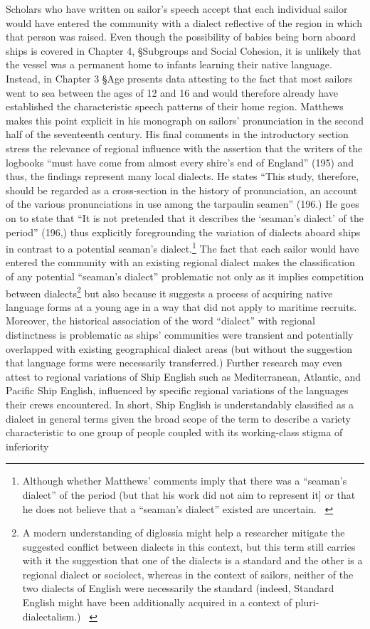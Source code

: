 \documentclass[12pt]{article}
\newcommand\textstylereferencetext[1]{#1}
\newenvironment{styleStandard}{\renewcommand\baselinestretch{1.0}\setlength\leftskip{0cm}\setlength\rightskip{0cm plus 1fil}\setlength\parindent{0cm}\setlength\parfillskip{0pt plus 1fil}\setlength\parskip{0in plus 1pt}\writerlistparindent\writerlistleftskip\leavevmode\normalfont\normalsize\writerlistlabel\ignorespaces}{\unskip\vspace{0in plus 1pt}\par}
\newcommand\writerlistleftskip{}
\newcommand\writerlistparindent{}
\newcommand\writerlistlabel{}
\begin{document}
\begin{styleStandard}
\textstylereferencetext{Scholars who have written on sailor’s speech accept that each individual sailor would have entered the community with a dialect reflective of the region in which that person was raised. }Even though the possibility of babies being born aboard ships is covered in Chapter 4, §Subgroups and Social Cohesion, it is unlikely that the vessel was a permanent home to infants learning their native language. Instead, in Chapter 3 §Age presents data attesting to the fact that most sailors went to sea between the ages of 12 and 16 and would therefore already have established the characteristic speech patterns of their home region. Matthews makes this point explicit in his monograph on sailors’ pronunciation in the second half of the seventeenth century. His final comments in the introductory section stress the relevance of regional influence with the assertion that the writers of the logbooks “must have come from almost every shire’s end of England” (195) and thus, the findings represent many local dialects. He states “This study, therefore, should be regarded as a cross-section in the history of pronunciation, an account of the various pronunciations in use among the tarpaulin seamen” (196.) He goes on to state that “It is not pretended that it describes the ‘seaman’s dialect’ of the period” (196,) thus explicitly foregrounding the variation of dialects aboard ships in contrast to a potential seaman’s dialect.\footnote{ Although whether Matthews’ comments imply that there was a “seaman’s dialect” of the period (but that his work did not aim to represent it] or that he does not believe that a “seaman’s dialect” existed are uncertain. \ } The fact that each sailor would have entered the community with an existing regional dialect makes the classification of any potential “seaman’s dialect” problematic not only as it implies competition between dialects\footnote{ A modern understanding of diglossia might help a researcher mitigate the suggested conflict between dialects in this context, but this term still carries with it the suggestion that one of the dialects is a standard and the other is a regional dialect or sociolect, whereas in the context of sailors, neither of the two dialects of English were necessarily the standard (indeed, Standard English might have been additionally acquired in a context of pluri-dialectalism.) \ } but also because it suggests a process of acquiring native language forms at a young age in a way that did not apply to maritime recruits. Moreover, the historical association of the word “dialect” with regional distinctness is problematic as ships’ communities were transient and potentially overlapped with existing geographical dialect areas (but without the suggestion that language forms were necessarily transferred.) Further research may even attest to regional variations of Ship English such as Mediterranean, Atlantic, and Pacific Ship English, influenced by specific regional variations of the languages their crews encountered. In short, Ship English is understandably classified as a dialect in general terms given the broad scope of the term to describe a variety characteristic to one group of people coupled with its working-class stigma of inferiority 
\end{styleStandard}
\end{document}

